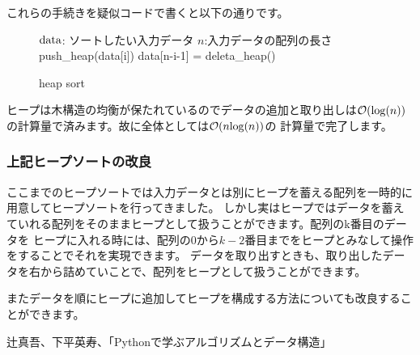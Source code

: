 \documentclass[dvipdfmx,pic,eepic,ecltree]{jarticle}
\begin{document}
これらの手続きを疑似コードで書くと以下の通りです。
\begin{figure}[H]
\begin{algorithm}[H]
	\caption{heap sort}
	\label{heap sort}
	\begin{algorithmic}[1]
	\STATE ${\rm data}$: ソートしたい入力データ
	\STATE $n$:入力データの配列の長さ
	\STATE push\_heap(data[i])
	\ENDFOR
	\STATE data[n-i-1] = deleta\_heap()
	\ENDFOR
	\end{algorithmic}
\end{algorithm}
\end{figure}
ヒープは木構造の均衡が保たれているのでデータの追加と取り出しは$\mathcal{O}({\rm log}(n))$の計算量で済みます。故に全体としては$\mathcal{O}(n{\rm log}(n))$の
計算量で完了します。
\subsubsection{上記ヒープソートの改良}
ここまでのヒープソートでは入力データとは別にヒープを蓄える配列を一時的に用意してヒープソートを行ってきました。
しかし実はヒープではデータを蓄えていれる配列をそのままヒープとして扱うことができます。配列のk番目のデータを
ヒープに入れる時には、配列の0から$k-2$番目までをヒープとみなして操作をすることでそれを実現できます。
データを取り出すときも、取り出したデータを右から詰めていことで、配列をヒープとして扱うことができます。

またデータを順にヒープに追加してヒープを構成する方法についても改良することができます。


\begin{thebibliography}{9}
\item 辻真吾、下平英寿、「Pythonで学ぶアルゴリズムとデータ構造」
\end{thebibliography}
\end{document}
